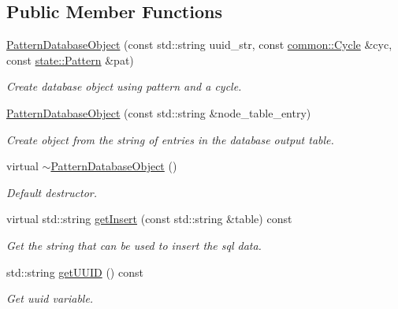 \subsection*{\-Public \-Member \-Functions}
\begin{DoxyCompactItemize}
\item 
\hyperlink{classcryomesh_1_1manager_1_1PatternDatabaseObject_a880f682507abc648bf30ca5b0572a802}{\-Pattern\-Database\-Object} (const std\-::string uuid\-\_\-str, const \hyperlink{classcryomesh_1_1common_1_1Cycle}{common\-::\-Cycle} \&cyc, const \hyperlink{classcryomesh_1_1state_1_1Pattern}{state\-::\-Pattern} \&pat)
\begin{DoxyCompactList}\small\item\em \-Create database object using pattern and a cycle. \end{DoxyCompactList}\item 
\hyperlink{classcryomesh_1_1manager_1_1PatternDatabaseObject_a77332450f88ed8904d0a0e92527668f3}{\-Pattern\-Database\-Object} (const std\-::string \&node\-\_\-table\-\_\-entry)
\begin{DoxyCompactList}\small\item\em \-Create object from the string of entries in the database output table. \end{DoxyCompactList}\item 
virtual \hyperlink{classcryomesh_1_1manager_1_1PatternDatabaseObject_aa3fc951fe7947592213f569cc375e3e5}{$\sim$\-Pattern\-Database\-Object} ()
\begin{DoxyCompactList}\small\item\em \-Default destructor. \end{DoxyCompactList}\item 
virtual std\-::string \hyperlink{classcryomesh_1_1manager_1_1PatternDatabaseObject_a0f4325cce7fd6c70017815ea50cd4fd6}{get\-Insert} (const std\-::string \&table) const 
\begin{DoxyCompactList}\small\item\em \-Get the string that can be used to insert the sql data. \end{DoxyCompactList}\item 
std\-::string \hyperlink{classcryomesh_1_1manager_1_1PatternDatabaseObject_a28cfc51ab59005adcef9b741f750ae37}{get\-U\-U\-I\-D} () const 
\begin{DoxyCompactList}\small\item\em \-Get uuid variable. \end{DoxyCompactList}\item 

\end{DoxyCompactItemize}
